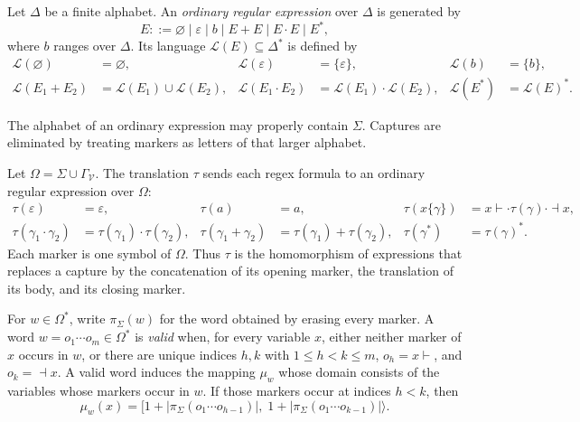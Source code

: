 \begin{definition}
\label{def:ordinary-regex}
Let $\Delta$ be a finite alphabet. An \emph{ordinary regular expression}
over $\Delta$ is generated by
\[
  E ::= \varnothing \mid \varepsilon \mid b \mid E+E \mid E\cdot E \mid E^{*},
\]
where $b$ ranges over $\Delta$. Its language
$\mathcal L(E)\subseteq\Delta^{*}$ is defined by
\begin{align*}
  \mathcal L(\varnothing)&=\varnothing, &
  \mathcal L(\varepsilon)&=\{\varepsilon\}, &
  \mathcal L(b)&=\{b\},\\
  \mathcal L(E_1+E_2)&=\mathcal L(E_1)\cup\mathcal L(E_2), &
  \mathcal L(E_1\cdot E_2)&=\mathcal L(E_1)\cdot\mathcal L(E_2), &
  \mathcal L(E^{*})&=\mathcal L(E)^{*}.
\end{align*}
\end{definition}

The alphabet of an ordinary expression may properly contain $\Sigma$.
Captures are eliminated by treating markers as letters of that larger
alphabet.

\begin{definition}
\label{def:tau}
Let $\Omega=\Sigma\cup\Gamma_{\mathcal V}$.
The translation $\tau$ sends each regex formula to an ordinary regular
expression over $\Omega$:
\begin{align*}
  \tau(\varepsilon)&=\varepsilon, &
  \tau(a)&=a, &
  \tau(x\{\gamma\})&=x\vdash\cdot\tau(\gamma)\cdot\dashv x,\\
  \tau(\gamma_1\cdot\gamma_2)&=\tau(\gamma_1)\cdot\tau(\gamma_2), &
  \tau(\gamma_1+\gamma_2)&=\tau(\gamma_1)+\tau(\gamma_2), &
  \tau(\gamma^{*})&=\tau(\gamma)^{*}.
\end{align*}
Each marker is one symbol of $\Omega$. Thus $\tau$ is the homomorphism
of expressions that replaces a capture by the concatenation of its
opening marker, the translation of its body, and its closing marker.
\end{definition}

\begin{definition}
\label{def:word-mapping}
For $w\in\Omega^{*}$, write $\pi_{\Sigma}(w)$ for the word obtained by
erasing every marker. A word $w=o_1\cdots o_m\in\Omega^{*}$ is
\emph{valid} when, for every variable $x$, either neither marker of $x$
occurs in $w$, or there are unique indices $h,k$ with
$1\leq h<k\leq m$, $o_h=x\vdash$, and $o_k=\dashv x$.
A valid word induces the mapping $\mu_w$ whose domain consists of the
variables whose markers occur in $w$. If those markers occur at
indices $h<k$, then
\[
  \mu_w(x)=
  \bigl[1+|\pi_{\Sigma}(o_1\cdots o_{h-1})|,\;
        1+|\pi_{\Sigma}(o_1\cdots o_{k-1})|\bigr\rangle.
\]
\end{definition}

